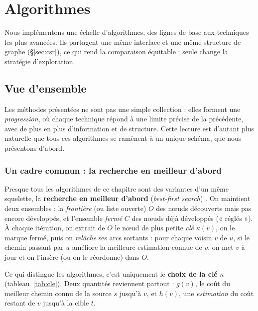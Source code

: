 \chapter{Algorithmes}
\label{ch:algos}

Nous implémentons une échelle d'algorithmes, des lignes de base aux techniques
les plus avancées. Ils partagent une même interface et une même
structure de graphe (\S\ref{sec:csr}), ce qui rend la comparaison équitable :
seule change la stratégie d'exploration.

\section{Vue d'ensemble}

Les méthodes présentées ne sont pas une simple collection : elles forment une
\emph{progression}, où chaque technique répond à une limite précise de la
précédente, avec de plus en plus d'information et de structure. Cette lecture est
d'autant plus naturelle que tous ces algorithmes se ramènent à un unique schéma,
que nous présentons d'abord.

\subsection{Un cadre commun : la recherche en meilleur d'abord}

Presque tous les algorithmes de ce chapitre sont des variantes d'un même
squelette, la \textbf{recherche en meilleur d'abord}
(\emph{best-first search}) \citep{russell2010aima}. On maintient deux ensembles :
la \emph{frontière} (ou liste ouverte) $O$ des nœuds découverts mais pas encore
développés, et l'ensemble \emph{fermé} $C$ des nœuds déjà développés (« réglés »).
À chaque itération, on extrait de $O$ le nœud de plus petite \emph{clé}
$\kappa(v)$, on le marque fermé, puis on \emph{relâche} ses arcs sortants : pour
chaque voisin $v$ de $u$, si le chemin passant par $u$ améliore la meilleure
estimation connue de $v$, on met $v$ à jour et on l'insère (ou on le réordonne)
dans $O$.

\medskip

Ce qui distingue les algorithmes, c'est uniquement le \textbf{choix de la clé}
$\kappa$ (tableau~\ref{tab:cle}). Deux quantités reviennent partout : $g(v)$, le
coût du meilleur chemin connu de la source $s$ jusqu'à $v$, et $h(v)$, une
\emph{estimation} du coût restant de $v$ jusqu'à la cible $t$.


